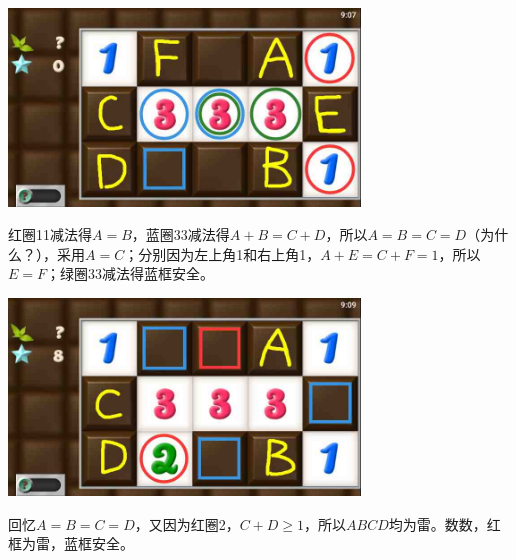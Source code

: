 \subsection{} %
\begin{center}
    \includegraphics[width=0.7\textwidth]{puzzlelow/116-1.jpg}
\end{center}
红圈11减法得$A=B$，蓝圈33减法得$A+B=C+D$，所以$A=B=C=D$（为什么？），采用$A=C$；分别因为左上角1和右上角1，$A+E=C+F=1$，所以$E=F$；绿圈33减法得蓝框安全。
\begin{center}
    \includegraphics[width=0.7\textwidth]{puzzlelow/116-2.jpg}
\end{center}
回忆$A=B=C=D$，又因为红圈2，$C+D\ge 1$，所以$ABCD$均为雷。数数，红框为雷，蓝框安全。

